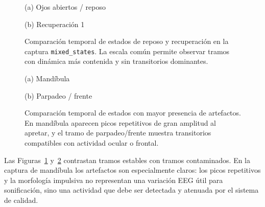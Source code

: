 \documentclass[../main.tex]{subfiles}
\begin{document}
\begin{figure}[htbp]
    \centering
    \begin{minipage}{0.49\textwidth}
        \centering
        \small (a) Ojos abiertos / reposo
    \end{minipage}
    \hfill
    \begin{minipage}{0.49\textwidth}
        \centering
        \small (b) Recuperación 1
    \end{minipage}
    \caption{Comparación temporal de estados de reposo y recuperación en la captura \texttt{mixed\_states}. La escala común permite observar tramos con dinámica más contenida y sin transitorios dominantes.}
    \label{fig:validacion_estados_temporales_reposo}
\end{figure}

\begin{figure}[htbp]
    \centering
    \begin{minipage}{0.49\textwidth}
        \centering
        \small (a) Mandíbula
    \end{minipage}
    \hfill
    \begin{minipage}{0.49\textwidth}
        \centering
        \small (b) Parpadeo / frente
    \end{minipage}
    \caption{Comparación temporal de estados con mayor presencia de artefactos. En mandíbula aparecen picos repetitivos de gran amplitud al apretar, y el tramo de parpadeo/frente muestra transitorios compatibles con actividad ocular o frontal.}
    \label{fig:validacion_estados_temporales_artefactos}
\end{figure}

Las Figuras~\ref{fig:validacion_estados_temporales_reposo} y~\ref{fig:validacion_estados_temporales_artefactos} contrastan tramos estables con tramos contaminados. En la captura de mandíbula los artefactos son especialmente claros: los picos repetitivos y la morfología impulsiva no representan una variación EEG útil para sonificación, sino una actividad que debe ser detectada y atenuada por el sistema de calidad.
\end{document}
